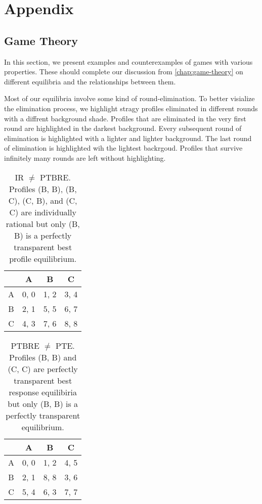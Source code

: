 \chapter{Appendix}

\section{Game Theory}
In this section, we present examples and counterexamples of games with various properties.
These should complete our discussion from \autoref{chap:game-theory} on different equilibria and the relationships between them.

Most of our equilibria involve some kind of round-elimination.
To better visialize the elimination process, we highlight stragy profiles eliminated in different rounds with a diffrent background shade.
Profiles that are eliminated in the very first round are highlighted in the \colorbox{gray!80}{darkest} background.
Every subsequent round of elimination is highlighted with a \colorbox{gray!60}{lighter} and \colorbox{gray!40}{lighter} background.
The last round of elimination is highlighted wih the \colorbox{gray!20}{lightest} backrgoud.
Profiles that survive infinitely many rounds are left without highlighting.

\begin{table}
	\caption{
		IR $\ne$ PTBRE.
		Profiles (B, B), (B, C), (C, B), and (C, C) are individually rational but only (B, B) is a perfectly transparent best profile equilibrium.
	}
	\label{tab:ir-ne-ptbre}
	\centering
	\begin{tabular}{|c|c|c|c|}
		\hline
			& A		& B	   & C	  \\
		\hline
		A 		&\cellcolor{gray!70} 0, 0 &\cellcolor{gray!70} 1, 2 &\cellcolor{gray!70} 3, 4 \\
		\hline
		B		&\cellcolor{gray!70} 2, 1 &\cellcolor{gray!20} 5, 5 &\cellcolor{gray!20} 6, 7 \\
		\hline
		C		&\cellcolor{gray!70} 4, 3 &\cellcolor{gray!20} 7, 6 &\cellcolor{gray!00} 8, 8 \\
		\hline
	\end{tabular}
\end{table}

\begin{table}
	\caption{
		PTBRE $\ne$ PTE.
		Profiles (B, B) and (C, C) are perfectly transparent best response equilibiria but only (B, B) is a perfectly transparent equilibrium.
	}
	\label{tab:ptbre-ne-pte}
	\centering
	\begin{tabular}{|c|c|c|c|}
		\hline
			& A		& B	   & C	  \\
		\hline
		A 		&\cellcolor{gray!70} 0, 0 &\cellcolor{gray!70} 1, 2 &\cellcolor{gray!70} 4, 5 \\
		\hline
		B		&\cellcolor{gray!70} 2, 1 &\cellcolor{gray!00} 8, 8 &\cellcolor{gray!70} 3, 6 \\
		\hline
		C		&\cellcolor{gray!70} 5, 4 &\cellcolor{gray!70} 6, 3 &\cellcolor{gray!20} 7, 7 \\
		\hline
	\end{tabular}
\end{table}

